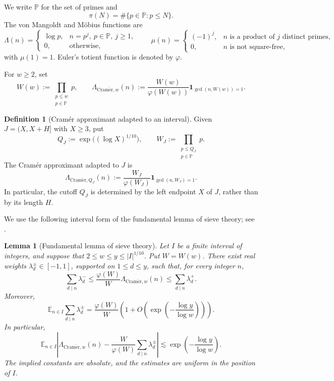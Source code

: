 \documentclass[10pt,leqno]{amsart}
\numberwithin{equation}{section}
\numberwithin{counter2}{section}
\newtheorem{lemma}[subsection]{Lemma}
\theoremstyle{definition}
\newtheorem{definition}[subsection]{Definition}
\theoremstyle{plain}
\newcommand{\Cramer}{\operatorname{Cram\acute{e}r}}
\begin{document}
	We write $\mathbb P$ for the set of primes and
	\[ \pi(N)=\#\{p\in\mathbb P:p\le N\}.\]
    The von Mangoldt and
	M\"obius functions are
	\[
	\Lambda(n)=
	\begin{cases}
		\log p,&n=p^j,\ p\in\mathbb P,\ j\ge1,\\
		0,&\text{otherwise},
	\end{cases}
	\qquad
	\mu(n)=
	\begin{cases}
		(-1)^j,&n\text{ is a product of }j\text{ distinct primes},\\
		0,&n\text{ is not square-free},
	\end{cases}
	\]
	with $\mu(1)=1$. Euler's totient function is denoted by $\varphi$.

	
	For $w\ge2$, set
	\[
	W(w):=\prod_{\substack{p\le w\\p\in\mathbb P}}p,
	\qquad
	\Lambda_{\Cramer,w}(n)
	:=\frac{W(w)}{\varphi(W(w))}
	\mathbf1_{\gcd(n,W(w))=1}.
	\]
	
	\begin{definition}[Cram\'er approximant adapted to an interval]
		\label{def:interval-cramer}
		Given $J=(X,X+H]$ with $X\ge3$, put
		\[
		Q_J:=\exp\bigl((\log X)^{1/10}\bigr),\qquad
		W_J:=\prod_{\substack{p\le Q_J\\p\in\mathbb P}}p.
		\]
		The Cram\'er approximant adapted to $J$ is
		\[
		\Lambda_{\Cramer,Q_J}(n)
		:=\frac{W_J}{\varphi(W_J)}
		\mathbf1_{\gcd(n,W_J)=1}.
		\]
		In particular, the cutoff $Q_J$ is determined by the left endpoint
		$X$ of $J$, rather than by its length $H$.
	\end{definition}
	
	We use the following interval form of the fundamental lemma of
	sieve theory; see \cite[Lemma 4.2]{KMTT25}.
	
	\begin{lemma}[Fundamental lemma of sieve theory]\label{fund-lemma}
		Let $I$ be a finite interval of integers, and suppose that
		$2\le w\le y\le |I|^{1/10}$. Put $W=W(w)$. There exist real
		weights $\lambda_d^\pm\in[-1,1]$, supported on $1\le d\le y$,
		such that, for every integer $n$,
		\[
		\sum_{d\mid n}\lambda_d^-
		\le\frac{\varphi(W)}W\Lambda_{\Cramer,w}(n)
		\le\sum_{d\mid n}\lambda_d^+.
		\]
		Moreover,
		\begin{equation}\label{eq:expecationdivsum}
			\mathbb E_{n\in I}\sum_{d\mid n}\lambda_d^\pm
			=\frac{\varphi(W)}W
			\left(1+O\left(\exp\left(-\frac{\log y}{\log w}\right)\right)\right).
		\end{equation}
		In particular,
		\[
		\mathbb E_{n\in I}
		\left|\Lambda_{\Cramer,w}(n)
		-\frac W{\varphi(W)}\sum_{d\mid n}\lambda_d^\pm\right|
		\lesssim\exp\left(-\frac{\log y}{\log w}\right).
		\]
		The implied constants are absolute, and the estimates are uniform
		in the position of $I$.
	\end{lemma}
	
\end{document}
